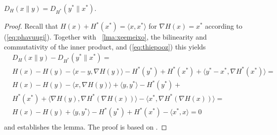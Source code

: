 \documentclass[12pt]{article}
\begin{document}
\begin{lemma}
  \label{lma:ohviomov}
$D_{H}(x\|y)=D_{H^{\ast}}\left(y^{\ast}\|x^{\ast}\right)$.
\end{lemma}
\begin{proof}
  \label{prf:keeseiph}
  Recall that $H(x)+H^{\ast}(x^{\ast})=\langle{}x,x^{\ast}\rangle$ for
  $\nabla{}H(x)=x^{\ast}$ according to (\ref{eq:phavuugi}). Together
  with {\emma}~\ref{lma:xeemeixo}, the bilinearity and commutativity of
  the inner product, and (\ref{eq:thiepooz}) this yields
\begin{equation}
  \label{eq:chahgheo}
  \begin{split}
& D_{H}(x\|y)-D_{H^{\ast}}\left(y^{\ast}\|x^{\ast}\right)= \\
& H(x)-H(y)-\langle{}x-y,\nabla{}H(y)\rangle-H^{\ast}(y^{\ast})+H^{\ast}(x^{\ast})+\langle{}y^{\ast}-x^{\ast},\nabla{}H^{\ast}(x^{\ast})\rangle= \\
& H(x)-H(y)-\langle{}x,\nabla{}H(y)\rangle+\langle{}y,y^{\ast}\rangle-H^{\ast}(y^{\ast})+ \\
& H^{\ast}(x^{\ast})+\langle{}\nabla{}H(y),\nabla{}H^{\ast}(\nabla{}H(x))\rangle-\langle{}x^{\ast},\nabla{}H^{\ast}(\nabla{}H(x))\rangle= \\
& H(x)-H(y)+\langle{}y,y^{\ast}\rangle-H^{\ast}(y^{\ast})+H^{\ast}(x^{\ast})-\langle{}x^{\ast},x\rangle=0 \\
  \end{split}
\end{equation}
and establishes the lemma. The proof is based on .
\end{proof}
\end{document}
